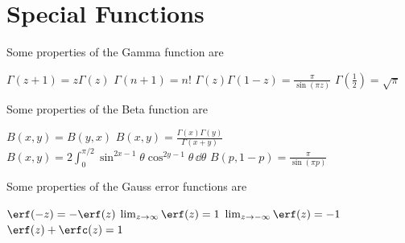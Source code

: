 \documentclass{report}
\begin{document}
\section{Special Functions}


Some properties of the Gamma function are
\begin{enumerate}
	\ii $\Gamma(z+1) = z\Gamma(z)$
	\ii $\Gamma(n+1) = n!$
	\ii $\Gamma(z)\Gamma(1-z) = \frac{\pi}{\sin(\pi z)}$
	\ii $\Gamma(\frac{1}{2}) = \sqrt{\pi}$
\end{enumerate}


Some properties of the Beta function are
\begin{enumerate}
	\ii $B(x,y) = B(y,x)$
	\ii $B(x,y) = \frac{\Gamma(x)\Gamma(y)}{\Gamma(x+y)}$
	\ii $B(x,y) = 2\int_0^{\pi/2} \sin^{2x-1}\theta\cos^{2y-1}\theta\,\dd{\theta}$
	\ii $B(p,1-p) = \frac{\pi}{\sin(\pi p)}$
\end{enumerate}



Some properties of the Gauss error functions are
\begin{enumerate}
	\ii $\erf(-z) = -\erf(z)$
	\ii $\lim_{z\to\infty} \erf(z) = 1$
	\ii $\lim_{z\to-\infty} \erf(z) = -1$
	\ii $\erf(z) + \erfc(z) = 1$
\end{enumerate}

\end{document}
